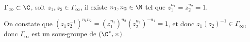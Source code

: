 $\Gamma_\infty \subset \C$, soit $z_1,z_2 \in \Gamma_\infty$, il existe $n_1,n_2 \in  \N$ tel que $z_1^{n_1} = z_2^{n_2} = 1$.

On constate que ${(z_1 z_2^{-1})}^{n_1n_2} = {(z_1^{n_1})}^{n_2} {(z_2^{n_2})}^{-n_1} = 1$, et donc $z_1(z_2)^{-1} \in \Gamma_\infty$, donc 
$ \Gamma_\infty$ est un sous-groupe de $(\C^*, \times)$.